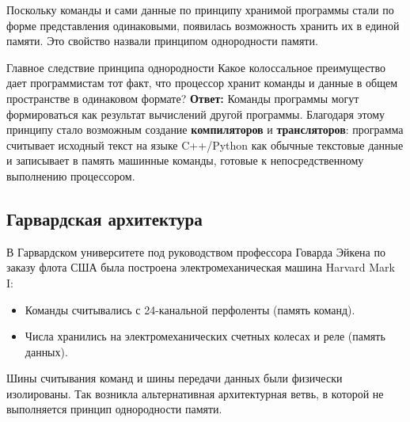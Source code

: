 \documentclass[11pt,a4paper]{article}
\begin{document}
Поскольку команды и сами данные по принципу хранимой программы стали по форме представления одинаковыми, появилась возможность хранить их в единой памяти. Это свойство назвали принципом однородности памяти.

\begin{questionbox}{Главное следствие принципа однородности}
Какое колоссальное преимущество дает программистам тот факт, что процессор хранит команды и данные в общем пространстве в одинаковом формате?
\tcblower
\textbf{Ответ:} Команды программы могут формироваться как результат вычислений другой программы. Благодаря этому принципу стало возможным создание \textbf{компиляторов} и \textbf{трансляторов}: программа считывает исходный текст на языке C++/Python как обычные текстовые данные и записывает в память машинные команды, готовые к непосредственному выполнению процессором.
\end{questionbox}

\subsection{Гарвардская архитектура}

В Гарвардском университете под руководством профессора Говарда Эйкена по заказу флота США была построена электромеханическая машина Harvard Mark I:
\begin{itemize}
    \item Команды считывались с 24-канальной перфоленты (память команд).
    \item Числа хранились на электромеханических счетных колесах и реле (память данных).
\end{itemize}

Шины считывания команд и шины передачи данных были физически изолированы. Так возникла альтернативная архитектурная ветвь, в которой не выполняется принцип однородности памяти.
\end{document}
